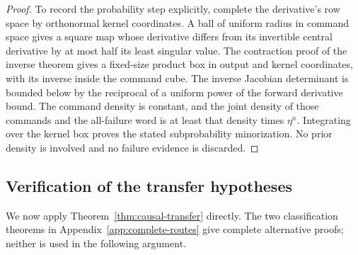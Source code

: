 \documentclass[11pt]{amsart}
\theoremstyle{definition}\newtheorem{definition}[theorem]{Definition}
\theoremstyle{remark}\newtheorem{remark}[theorem]{Remark}
\begin{document}
\begin{proof}
To record the probability step explicitly, complete the derivative's row
space by orthonormal kernel coordinates. A ball of uniform radius in
command space gives a square map whose derivative differs from its
invertible central derivative by at most half its least singular value.
The contraction proof of the inverse theorem gives a fixed-size product
box in output and kernel coordinates, with its inverse inside the command
cube. The inverse Jacobian determinant is bounded below by the reciprocal
of a uniform power of the forward derivative bound. The command density
is constant, and the joint density of those commands and the all-failure
word is at least that density times $\eta^n$. Integrating over the
kernel box proves the stated subprobability minorization. No prior
density is involved and no failure evidence is discarded.
\end{proof}


\subsection{Verification of the transfer hypotheses}
\label{sec:transfer-application}
We now apply Theorem~\ref{thm:causal-transfer} directly. The two
classification theorems in Appendix~\ref{app:complete-routes} give
complete alternative proofs; neither is used in the following argument.
\end{document}
